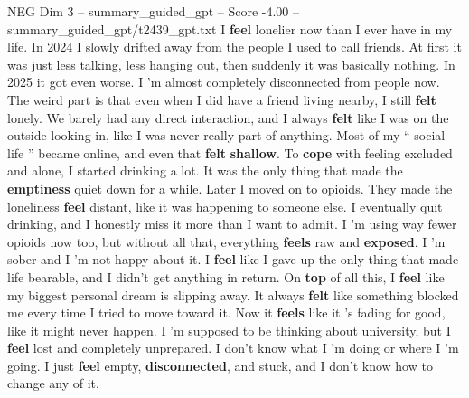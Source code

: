 \begin{textsample}{NEG Dim 3 – summary\_guided\_gpt – Score -4.00 – summary\_guided\_gpt/t2439\_gpt.txt}  \label{ex:f3_neg_022}
I \textbf{feel} lonelier now than I ever have in my life.
In 2024 I slowly drifted away from the people I used to call friends.
At first it was just less talking, less hanging out, then suddenly it was basically nothing.
In 2025 it got even worse.
I ’m almost completely disconnected from people now.
The weird part is that even when I did have a friend living nearby, I still \textbf{felt} lonely.
We barely had any direct interaction, and I always \textbf{felt} like I was on the outside looking in, like I was never really part of anything.
Most of my “ social life ” became online, and even that \textbf{felt} \textbf{shallow}.
To \textbf{cope} with feeling excluded and alone, I started drinking a lot.
It was the only thing that made the \textbf{emptiness} quiet down for a while.
Later I moved on to opioids.
They made the loneliness \textbf{feel} distant, like it was happening to someone else.
I eventually quit drinking, and I honestly miss it more than I want to admit.
I ’m using way fewer opioids now too, but without all that, everything \textbf{feels} raw and \textbf{exposed}.
I ’m sober and I ’m not happy about it.
I \textbf{feel} like I gave up the only thing that made life bearable, and I didn't get anything in return.
On \textbf{top} of all this, I \textbf{feel} like my biggest personal dream is slipping away.
It always \textbf{felt} like something blocked me every time I tried to move toward it.
Now it \textbf{feels} like it ’s fading for good, like it might never happen.
I ’m supposed to be thinking about university, but I \textbf{feel} lost and completely unprepared.
I don't know what I ’m doing or where I ’m going.
I just \textbf{feel} empty, \textbf{disconnected}, and stuck, and I don't know how to change any of it.

\end{textsample}
